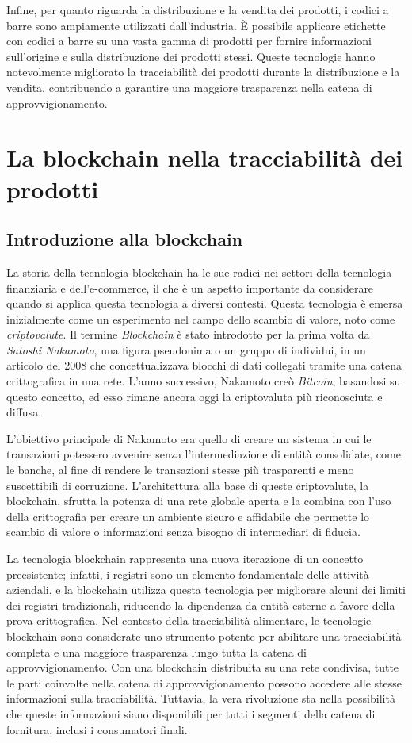 Infine, per quanto riguarda la distribuzione e la vendita dei prodotti, i codici a barre sono ampiamente utilizzati dall'industria. È possibile applicare etichette con codici a barre su una vasta gamma di prodotti per fornire informazioni sull'origine e sulla distribuzione dei prodotti stessi. Queste tecnologie hanno notevolmente migliorato la tracciabilità dei prodotti durante la distribuzione e la vendita, contribuendo a garantire una maggiore trasparenza nella catena di approvvigionamento.

\section{La blockchain nella tracciabilità dei prodotti}
\subsection{Introduzione alla blockchain}

La storia della tecnologia blockchain ha le sue radici nei settori della tecnologia finanziaria e dell'e-commerce, il che è un aspetto importante da considerare quando si applica questa tecnologia a diversi contesti. Questa tecnologia è emersa inizialmente come un esperimento nel campo dello scambio di valore, noto come \textit{criptovalute}. Il termine \textit{Blockchain} è stato introdotto per la prima volta da \textit{Satoshi Nakamoto}, una figura pseudonima o un gruppo di individui, in un articolo del 2008 che concettualizzava blocchi di dati collegati tramite una catena crittografica in una rete. L'anno successivo, Nakamoto creò \textit{Bitcoin}, basandosi su questo concetto, ed esso rimane ancora oggi la criptovaluta più riconosciuta e diffusa. 

L'obiettivo principale di Nakamoto era quello di creare un sistema in cui le transazioni potessero avvenire senza l'intermediazione di entità consolidate, come le banche, al fine di rendere le transazioni stesse più trasparenti e meno suscettibili di corruzione. L'architettura alla base di queste criptovalute, la blockchain, sfrutta la potenza di una rete globale aperta e la combina con l'uso della crittografia per creare un ambiente sicuro e affidabile che permette lo scambio di valore o informazioni senza bisogno di intermediari di fiducia.

La tecnologia blockchain rappresenta una nuova iterazione di un concetto preesistente; infatti, i registri sono un elemento fondamentale delle attività aziendali, e la blockchain utilizza questa tecnologia per migliorare alcuni dei limiti dei registri tradizionali, riducendo la dipendenza da entità esterne a favore della prova crittografica. Nel contesto della tracciabilità alimentare, le tecnologie blockchain sono considerate uno strumento potente per abilitare una tracciabilità completa e una maggiore trasparenza lungo tutta la catena di approvvigionamento. Con una blockchain distribuita su una rete condivisa, tutte le parti coinvolte nella catena di approvvigionamento possono accedere alle stesse informazioni sulla tracciabilità. Tuttavia, la vera rivoluzione sta nella possibilità che queste informazioni siano disponibili per tutti i segmenti della catena di fornitura, inclusi i consumatori finali.

